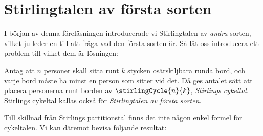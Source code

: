 \documentclass[nobib]{tufte-handout}
\begin{document}
\section{Stirlingtalen av första sorten}

I början av denna föreläsningen introducerade vi Stirlingtalen av \emph{andra} sorten, vilket ju leder en till att fråga vad den första sorten är. Så låt oss introducera ett problem till vilket dem är lösningen:

\begin{definition}
  Antag att $n$ personer skall sitta runt $k$ stycken osärskiljbara runda bord, och varje bord måste ha minst en person som sitter vid det. Då ges antalet sätt att placera personerna runt borden av $\stirlingCycle{n}{k}$, \emph{Stirlings cykeltal}. Stirlings cykeltal kallas också för \emph{Stirlingtalen av första sorten}.
\end{definition}

Till skillnad från Stirlings partitionstal finns det inte någon enkel formel för cykeltalen. Vi kan däremot bevisa följande resultat:
\end{document}

